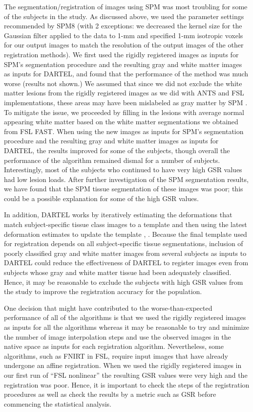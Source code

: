 \documentclass[10pt]{article}
\begin{document}
The segmentation/registration of images using SPM was most troubling for some of the subjects in the study. As discussed above, we used the parameter settings recommended by SPM8 (with 2 exceptions: we decreased the kernel size for the Gaussian filter applied to the data to 1-mm and specified 1-mm isotropic voxels for our output images to match the resolution of the output images of the other registration methods). We first used the rigidly registered images as inputs for SPM's segmentation procedure and the resulting gray and white matter images as inputs for DARTEL, and found that the performance of the method was much worse (results not shown.) We assumed that since we did not exclude the white matter lesions from the rigidly registered images as we did with ANTS and FSL implementations, these areas may have been mislabeled as gray matter by SPM \cite{bendfeldt2010spatiotemporal}. To mitigate the issue, we proceeded by filling in the lesions with average normal appearing white matter based on the white matter segmentations we obtained from FSL FAST. When using the new images as inputs for SPM's segmentation procedure and the resulting gray and white matter images as inputs for DARTEL, the results improved for some of the subjects, though overall the performance of the algorithm remained dismal for a number of subjects. Interestingly, most of the subjects who continued to have very high GSR values had low lesion loads. After further investigation of the SPM segmentation results, we have found that the SPM tissue segmentation of these images was poor; this could be a possible explanation for some of the high GSR values. 

In addition, DARTEL works by iteratively estimating the deformations that match subject-specific tissue class images to a template and then using the latest deformation estimates to update the template \cite{ashburner2007fast}, \cite{ashburner2009computing}. Because the final template used for registration depends on all subject-specific tissue segmentations, inclusion of poorly classified gray and white matter images from several subjects as inputs to DARTEL could reduce the effectiveness of DARTEL to register images even from subjects whose gray and white matter tissue had been adequately classified. Hence, it may be reasonable to exclude the subjects with high GSR values from the study to improve the registration accuracy for the population. 

One decision that might have contributed to the worse-than-expected performance of all of the algorithms is that we used the rigidly registered images as inputs for all the algorithms whereas it may be reasonable to try and minimize the number of image interpolation steps and use the observed images in the native space as inputs for each registration algorithm. Nevertheless,  some algorithms, such as FNIRT in FSL, require input images that have already undergone an affine registration. When we used the rigidly registered images in our first run of ``FSL nonlinear'' the resulting GSR values were very high and the registration was poor. Hence, it is important to check the steps of the registration procedures as well as check the results by a metric such as GSR before commencing the statistical analysis. 
\end{document}
